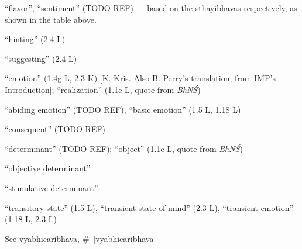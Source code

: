 \documentclass[10pt]{article}
\begin{document}
\begin{multicols}{2}
\begin{enumerate}[
			leftmargin=0em,
			rightmargin=0em,
		]
		 ``flavor'', ``sentiment'' (TODO REF) --- based on the sthāyibhāvas respectively, as shown in the table above.



		 ``hinting'' (2.4 L)

		 ``suggesting'' (2.4 L)


		 ``emotion'' (1.4g L, 2.3 K) [K. Kris. Also B. Perry's translation, from IMP's Introduction]; ``realization'' (1.1e L, quote from \textit{BhNŚ})

		 ``abiding emotion'' (TODO REF), ``basic emotion'' (1.5 L, 1.18 L)

		 ``consequent'' (TODO REF)

		 ``determinant'' (TODO REF); ``object'' (1.1e L, quote from \textit{BhNŚ})
		\begin{enumerate}
			 ``objective determinant''

			 ``stimulative determinant''
		\end{enumerate}


		 ``transitory state'' (1.5 L), %
		``transient state of mind'' (2.3 L), %
		``transient emotion'' (1.18 L, 2.3 L)

		 See vyabhicāribhāva, \#~\ref{vyabhicāribhāva}





\end{enumerate}
\end{multicols}
\end{document}

